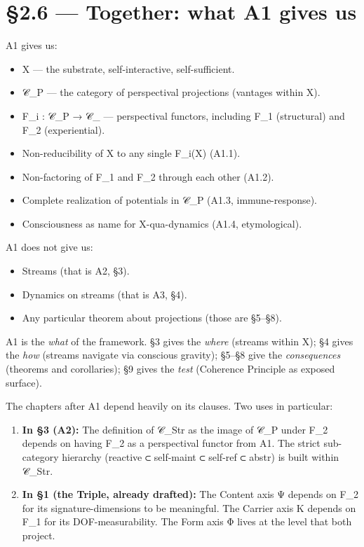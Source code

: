 \documentclass[11pt, openany]{book}
\newcommand{\sectionbreak}{\clearpage}
\begin{document}
\sectionbreak

\section{§2.6 --- Together: what A1 gives us}

A1 gives us:
\begin{itemize}
\item X --- the substrate, self-interactive, self-sufficient.
\item 𝒞\_\allowbreak{}P --- the category of perspectival projections (vantages within X).
\item F\_\allowbreak{}i : 𝒞\_\allowbreak{}P → 𝒞\_ --- perspectival functors, including F\_\allowbreak{}1 (structural) and F\_\allowbreak{}2 (experiential).
\item Non-reducibility of X to any single F\_\allowbreak{}i(X) (A1.1).
\item Non-factoring of F\_\allowbreak{}1 and F\_\allowbreak{}2 through each other (A1.2).
\item Complete realization of potentials in 𝒞\_\allowbreak{}P (A1.3, immune-response).
\item Consciousness as name for X-qua-dynamics (A1.4, etymological).
\end{itemize}

A1 does not give us:
\begin{itemize}
\item Streams (that is A2, §3).
\item Dynamics on streams (that is A3, §4).
\item Any particular theorem about projections (those are §5–§8).
\end{itemize}

A1 is the \textit{what} of the framework. §3 gives the \textit{where} (streams within X); §4 gives the \textit{how} (streams navigate via conscious gravity); §5–§8 give the \textit{consequences} (theorems and corollaries); §9 gives the \textit{test} (Coherence Principle as exposed surface).

The chapters after A1 depend heavily on its clauses. Two uses in particular:

\begin{enumerate}
\item \textbf{In §3 (A2):} The definition of 𝒞\_\allowbreak{}Str as the image of 𝒞\_\allowbreak{}P under F\_\allowbreak{}2 depends on having F\_\allowbreak{}2 as a perspectival functor from A1. The strict sub-category hierarchy (reactive ⊂ self-maint ⊂ self-ref ⊂ abstr) is built within 𝒞\_\allowbreak{}Str.
\item \textbf{In §1 (the Triple, already drafted):} The Content axis Ψ depends on F\_\allowbreak{}2 for its signature-dimensions to be meaningful. The Carrier axis K depends on F\_\allowbreak{}1 for its DOF-measurability. The Form axis Φ lives at the level that both project.
\end{enumerate}
\end{document}
